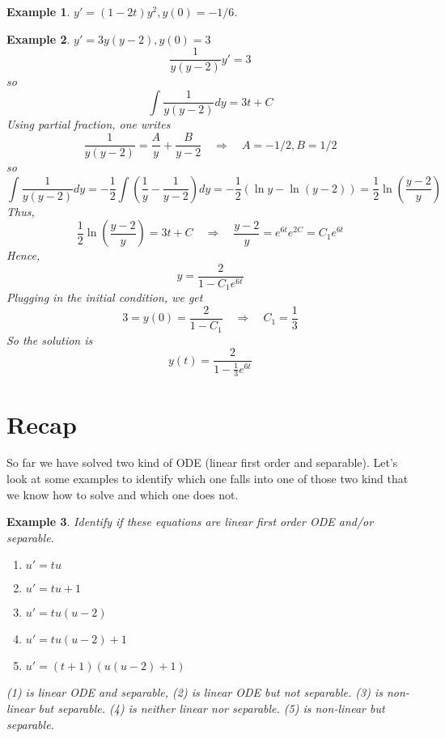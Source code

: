 \documentclass[10pt]{amsart}
\newtheorem{example}{Example}
\renewcommand{\l}{\left}
\renewcommand{\r}{\right}
\newcommand{\imply}{ \quad \Rightarrow \quad}
\begin{document}
\begin{example} $y' = (1-2t) y^{2}, y(0) = -1/6$.
\end{example}

\begin{example} $y' =3y(y-2), y(0) = 3$
$$\frac{1}{y(y-2)}y' = 3 $$
so
$$ \int \frac{1}{y(y-2)}dy = 3t+C $$
Using partial fraction, one writes
$$ \frac{1}{y(y-2)} = \frac{A}{y} + \frac{B}{y-2} \imply A = -1/2, B=1/2 $$
so 
$$ \int \frac{1}{y(y-2)}dy = -\frac{1}{2} \int \l( \frac{1}{y} - \frac{1}{y-2} \r)dy = - \frac{1}{2}( \ln y - \ln (y-2) )= \frac{1}{2} \ln \l( \frac{y-2}{y} \r) $$
Thus,
$$  \frac{1}{2} \ln \l( \frac{y-2}{y} \r)  = 3t + C \imply \frac{y-2}{y} = e^{6t}e^{2C} = C_{1}e^{6t} $$
Hence,
$$ y = \frac{2}{1-C_{1}e^{6t}} $$
Plugging in the initial condition, we get
$$ 3 = y(0) = \frac{2}{1-C_{1}} \imply C_{1} = \frac{1}{3} $$
So the solution is
$$ y(t) = \frac{2}{1-\frac{1}{3}e^{6t}} $$


\end{example}

\section{Recap}

So far we have solved two kind of ODE (linear first order and separable). Let's look at some examples to identify which one falls into one of those two kind that we know how to solve and which one does not.

\begin{example} Identify if these equations are linear first order ODE and/or separable. 
\begin{enumerate}
\item $u'=tu$
\item $u' =tu+1$
\item$u' =  tu(u-2)$
\item$u' = tu(u-2) + 1$
\item$u' =( t+1)(u(u-2)+1)$
\end{enumerate}
(1) is linear ODE and separable, (2) is linear ODE but not separable. (3) is non-linear but separable. (4) is neither linear nor separable. (5) is non-linear but separable. 
\end{example} 


 
\end{document}
